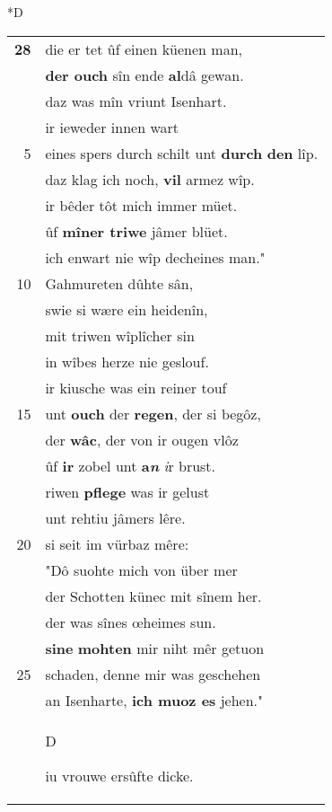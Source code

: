 \documentclass[8pt,a4paper,notitlepage]{article}
\begin{document}
\begin{table}[ht]
\begin{minipage}[t]{0.5\linewidth}
\small
\begin{center}*D
\end{center}
\begin{tabular}{rl}
\textbf{28} & die er tet ûf einen küenen man,\\ 
 & \textbf{der ouch} sîn ende \textbf{al}dâ gewan.\\ 
 & daz was mîn vriunt Isenhart.\\ 
 & ir ieweder innen wart\\ 
5 & eines spers durch schilt unt \textbf{durch} \textbf{den} lîp.\\ 
 & daz klag ich noch, \textbf{vil} armez wîp.\\ 
 & ir bêder tôt mich immer müet.\\ 
 & ûf \textbf{mîner triwe} jâmer blüet.\\ 
 & ich enwart nie wîp decheines man."\\ 
10 & Gahmureten dûhte sân,\\ 
 & swie si wære ein heidenîn,\\ 
 & mit triwen wîplîcher sin\\ 
 & in wîbes herze nie geslouf.\\ 
 & ir kiusche was ein reiner touf\\ 
15 & unt \textbf{ouch} der \textbf{regen}, der si begôz,\\ 
 & der \textbf{wâc}, der von ir ougen vlôz\\ 
 & ûf \textbf{ir} zobel unt \textbf{a\textit{n}} \textit{i}r brust.\\ 
 & riwen \textbf{pflege} was ir gelust\\ 
 & unt rehtiu jâmers lêre.\\ 
20 & si seit im vürbaz mêre:\\ 
 & "Dô suohte mich von über mer\\ 
 & der Schotten künec mit sînem her.\\ 
 & der was sînes œheimes sun.\\ 
 & \textbf{si}\textbf{ne} \textbf{mohten} mir niht mêr getuon\\ 
25 & schaden, denne mir was geschehen\\ 
 & an Isenharte, \textbf{ich muoz es} jehen."\\ 
 & \begin{large}D\end{large}iu vrouwe ersûfte dicke.\\ 

\end{tabular}
\end{minipage}
\end{table}
\end{document}
